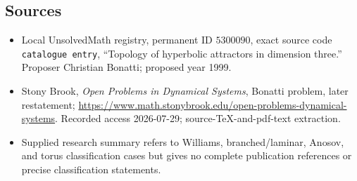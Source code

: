 \documentclass[11pt]{article}
\begin{document}
\subsection{Sources}
\begin{itemize}
\item Local UnsolvedMath registry, permanent ID \(5300090\), exact source code \texttt{catalogue entry}, ``Topology of hyperbolic attractors in dimension three.'' Proposer Christian Bonatti; proposed year 1999.
\item Stony Brook, \emph{Open Problems in Dynamical Systems}, Bonatti problem, later restatement; \url{https://www.math.stonybrook.edu/open-problems-dynamical-systems}. Recorded access 2026-07-29; source-TeX-and-pdf-text extraction.
\item Supplied research summary refers to Williams, branched/laminar, Anosov, and torus classification cases but gives no complete publication references or precise classification statements.
\end{itemize}
\end{document}
